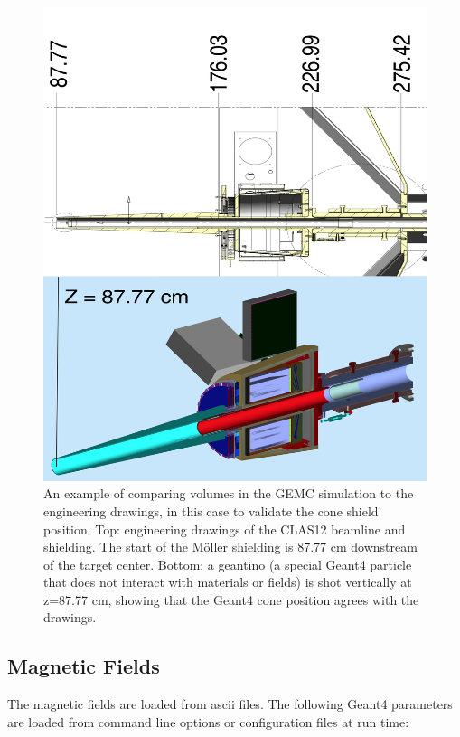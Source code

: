 \begin{figure}
	\centering
	\includegraphics[width=0.99\columnwidth,keepaspectratio]{img/cadValidationExample.png}
	\caption{An example of comparing volumes in the GEMC simulation to the engineering drawings, in this case to validate the cone shield
             position. Top: engineering drawings of the CLAS12 beamline and shielding. The start of the M\"oller shielding is 87.77 cm downstream
             of the target center. Bottom: a geantino (a special Geant4 particle that does not interact with materials or fields)
             is shot vertically at z=87.77 cm, showing that the Geant4 cone position agrees with the drawings.}
	\label{fig:cadValidationExample}
\end{figure}



\subsection{Magnetic Fields}
The magnetic fields are loaded from ascii files. The following Geant4 parameters are loaded from
command line options or configuration files at run time:

